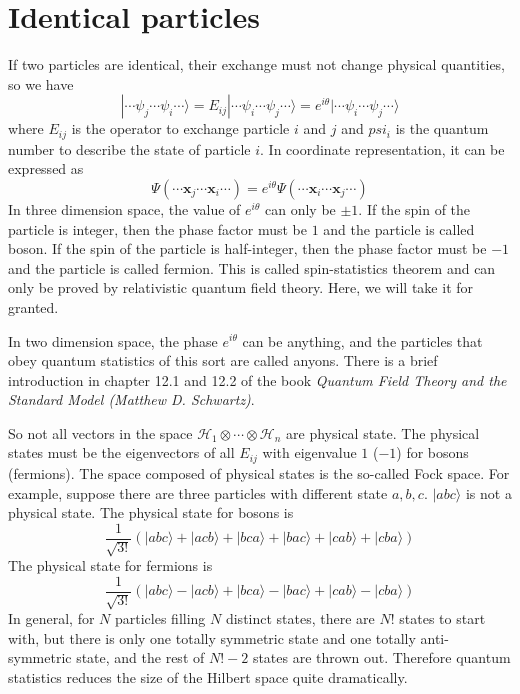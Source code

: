 \section{Identical particles}
If two particles are identical, their exchange must not change physical quantities, so we have
\[|\cdots\psi_j\cdots\psi_i\cdots\rangle = E_{ij}|\cdots\psi_i\cdots\psi_j\cdots\rangle = e^{i\theta} |\cdots\psi_i\cdots\psi_j\cdots\rangle\]
where $E_{ij}$ is the operator to exchange particle $i$ and $j$ and $psi_i$ is the quantum number to describe the state of particle $i$.
In coordinate representation, it can be expressed as
\[\Psi(\cdots\bm{x}_j\cdots\bm{x}_i\cdots) = e^{i\theta} \Psi(\cdots\bm{x}_i\cdots\bm{x}_j\cdots)\]
In three dimension space, the value of $e^{i\theta}$ can only be $\pm 1$. If the spin of the particle is integer, then the phase factor must be $1$ and the particle is called boson. If the spin of the particle is half-integer, then the phase factor must be $-1$ and the particle is called fermion. This is called spin-statistics theorem and can only be proved by relativistic quantum field theory. Here, we will take it for granted.
\begin{note}
In two dimension space, the phase $e^{i\theta}$ can be anything, and the particles that obey quantum statistics of this sort are called anyons. There is a brief introduction in chapter 12.1 and
12.2 of the book \emph{Quantum Field Theory and the Standard Model (Matthew D. Schwartz)}.
\end{note}
\noindent
So not all vectors in the space $\mathcal{H}_1\otimes\cdots\otimes\mathcal{H}_n$ are physical state. The physical states must be the eigenvectors of all $E_{ij}$ with eigenvalue $1$ ($-1$) for bosons (fermions). The space composed of physical states is the so-called Fock space. For example, suppose there are three particles with different state $a,b,c$. $|abc\rangle$ is not a physical state. The physical state for bosons is
\[\frac{1}{\sqrt{3!}} \left( |abc\rangle + |acb\rangle + |bca\rangle + |bac\rangle + |cab\rangle + |cba\rangle\right)\]
The physical state for fermions is
\[\frac{1}{\sqrt{3!}} \left( |abc\rangle - |acb\rangle + |bca\rangle - |bac\rangle + |cab\rangle - |cba\rangle\right)\]
In general, for $N$ particles filling $N$ distinct states, there are $N!$ states to start with, but there is only one totally symmetric state and one totally anti-symmetric state, and the rest of $N!-2$ states are thrown out. Therefore quantum statistics reduces the size of the Hilbert space quite dramatically.\\

